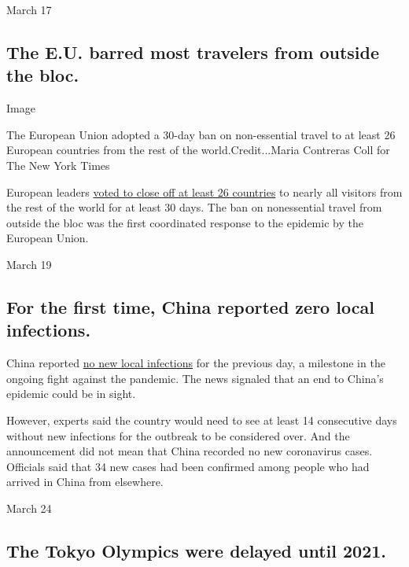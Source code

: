 March 17

\hypertarget{the-eu-barred-most-travelers-from-outside-the-bloc}{%
\subsection{The E.U. barred most travelers from outside the
bloc.}\label{the-eu-barred-most-travelers-from-outside-the-bloc}}

Image

The European Union adopted a 30-day ban on non-essential travel to at
least 26 European countries from the rest of the world.Credit...Maria
Contreras Coll for The New York Times

European leaders
\href{https://www.nytimes3xbfgragh.onion/2020/03/17/world/europe/EU-closes-borders-virus.html}{voted
to close off at least 26 countries} to nearly all visitors from the rest
of the world for at least 30 days. The ban on nonessential travel from
outside the bloc was the first coordinated response to the epidemic by
the European Union.

March 19

\hypertarget{for-the-first-time-china-reported-zero-local-infections}{%
\subsection{For the first time, China reported zero local
infections.}\label{for-the-first-time-china-reported-zero-local-infections}}

China reported
\href{https://www.nytimes3xbfgragh.onion/2020/03/18/world/asia/china-coronavirus-zero-infections.html}{no
new local infections} for the previous day, a milestone in the ongoing
fight against the pandemic. The news signaled that an end to China's
epidemic could be in sight.

However, experts said the country would need to see at least 14
consecutive days without new infections for the outbreak to be
considered over. And the announcement did not mean that China recorded
no new coronavirus cases. Officials said that 34 new cases had been
confirmed among people who had arrived in China from elsewhere.

March 24

\hypertarget{the-tokyo-olympics-were-delayed-until-2021}{%
\subsection{The Tokyo Olympics were delayed until
2021.}\label{the-tokyo-olympics-were-delayed-until-2021}}

